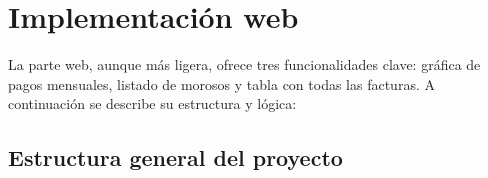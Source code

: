 \section{Implementación web}

\begin{large}

La parte web, aunque más ligera, ofrece tres funcionalidades clave: gráfica de pagos mensuales, listado de morosos y tabla con todas las facturas. A continuación se describe su estructura y lógica:

\end{large}

\subsection{Estructura general del proyecto}

